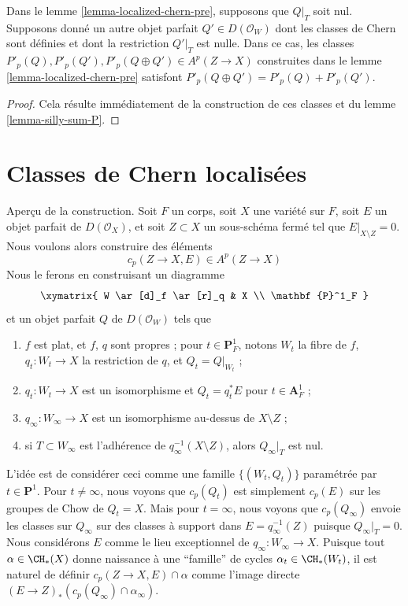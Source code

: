 \begin{lemma}
\label{lemma-localized-chern-pre-sum-P}
Dans le lemme \ref{lemma-localized-chern-pre}, supposons que $Q|_T$ soit nul.
Supposons donné un autre objet parfait $Q' \in D(\mathcal{O}_W)$
dont les classes de Chern sont définies et dont la restriction $Q'|_T$ est nulle.
Dans ce cas, les classes
$P'_p(Q), P'_p(Q'), P'_p(Q \oplus Q') \in A^p(Z \to X)$
construites dans le lemme \ref{lemma-localized-chern-pre}
satisfont $P'_p(Q \oplus Q') = P'_p(Q) + P'_p(Q')$.
\end{lemma}

\begin{proof}
Cela résulte immédiatement de la construction de ces
classes et du lemme \ref{lemma-silly-sum-P}.
\end{proof}









 
\section{Classes de Chern localisées}
\label{section-localized-chern}

\noindent
Aperçu de la construction. Soit $F$ un corps,
soit $X$ une variété sur $F$, soit $E$ un objet parfait de
$D(\mathcal{O}_X)$, et soit $Z \subset X$ un sous-schéma fermé
tel que $E|_{X \setminus Z} = 0$. Nous voulons alors construire des éléments
$$
c_p(Z \to X, E) \in A^p(Z \to X)
$$
Nous le ferons en construisant un diagramme
$$
\xymatrix{
W \ar[d]_f \ar[r]_q & X \\
\mathbf{P}^1_F
}
$$
et un objet parfait $Q$ de $D(\mathcal{O}_W)$ tels que
\begin{enumerate}
\item $f$ est plat, et $f$, $q$ sont propres ; pour $t \in \mathbf{P}^1_F$,
notons $W_t$ la fibre de $f$,
$q_t : W_t \to X$ la restriction de $q$, et $Q_t = Q|_{W_t}$ ;
\item $q_t : W_t \to X$ est un isomorphisme et $Q_t = q_t^*E$
pour $t \in \mathbf{A}^1_F$ ;
\item $q_\infty : W_\infty \to X$ est un isomorphisme au-dessus de $X \setminus Z$ ;
\item si $T \subset W_\infty$ est l'adhérence de
$q_\infty^{-1}(X \setminus Z)$, alors $Q_\infty|_T$ est nul.
\end{enumerate}
L'idée est de considérer ceci comme une famille $\{(W_t, Q_t)\}$
paramétrée par $t \in \mathbf{P}^1$.
Pour $t \not = \infty$, nous voyons que $c_p(Q_t)$ est simplement $c_p(E)$
sur les groupes de Chow de $Q_t = X$. Mais pour $t = \infty$, nous voyons que
$c_p(Q_\infty)$ envoie les classes sur $Q_\infty$ sur des classes à support dans
$E = q_\infty^{-1}(Z)$ puisque $Q_\infty|_T = 0$.
Nous considérons $E$ comme le lieu exceptionnel de $q_\infty : W_\infty \to X$.
Puisque tout $\alpha \in \CH_*(X)$ donne naissance à une ``famille''
de cycles $\alpha_t \in \CH_*(W_t)$, il est naturel de définir
$c_p(Z \to X, E) \cap \alpha$ comme
l'image directe $(E \to Z)_*(c_p(Q_\infty) \cap \alpha_\infty)$.

